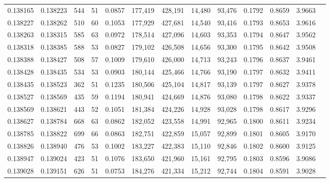 \begin{tabular}{rrrrrrrrrrrrr}
0.138165 & 0.138223 &   544 &  51 &                                     0.0857 & 177,419 & 428,191 &  14,480 &  93,476 & 0.1792 & 0.8659 & 3.9663 \\
0.138227 & 0.138262 &   510 &  60 &                                     0.1053 & 177,929 & 427,681 &  14,540 &  93,416 & 0.1793 & 0.8653 & 3.9616 \\
0.138263 & 0.138315 &   585 &  63 &                                     0.0972 & 178,514 & 427,096 &  14,603 &  93,353 & 0.1794 & 0.8647 & 3.9562 \\
0.138318 & 0.138385 &   588 &  53 &                                     0.0827 & 179,102 & 426,508 &  14,656 &  93,300 & 0.1795 & 0.8642 & 3.9508 \\
0.138388 & 0.138427 &   508 &  57 &                                     0.1009 & 179,610 & 426,000 &  14,713 &  93,243 & 0.1796 & 0.8637 & 3.9461 \\
0.138428 & 0.138435 &   534 &  53 &                                     0.0903 & 180,144 & 425,466 &  14,766 &  93,190 & 0.1797 & 0.8632 & 3.9411 \\
0.138435 & 0.138523 &   362 &  51 &                                     0.1235 & 180,506 & 425,104 &  14,817 &  93,139 & 0.1797 & 0.8627 & 3.9378 \\
0.138527 & 0.138569 &   435 &  59 &                                     0.1194 & 180,941 & 424,669 &  14,876 &  93,080 & 0.1798 & 0.8622 & 3.9337 \\
0.138569 & 0.138621 &   443 &  52 &                                     0.1051 & 181,384 & 424,226 &  14,928 &  93,028 & 0.1798 & 0.8617 & 3.9296 \\
0.138627 & 0.138784 &   668 &  63 &                                     0.0862 & 182,052 & 423,558 &  14,991 &  92,965 & 0.1800 & 0.8611 & 3.9234 \\
0.138785 & 0.138822 &   699 &  66 &                                     0.0863 & 182,751 & 422,859 &  15,057 &  92,899 & 0.1801 & 0.8605 & 3.9170 \\
0.138826 & 0.138940 &   476 &  53 &                                     0.1002 & 183,227 & 422,383 &  15,110 &  92,846 & 0.1802 & 0.8600 & 3.9125 \\
0.138947 & 0.139024 &   423 &  51 &                                     0.1076 & 183,650 & 421,960 &  15,161 &  92,795 & 0.1803 & 0.8596 & 3.9086 \\
0.139028 & 0.139151 &   626 &  51 &                                     0.0753 & 184,276 & 421,334 &  15,212 &  92,744 & 0.1804 & 0.8591 & 3.9028 \\

\end{tabular}
